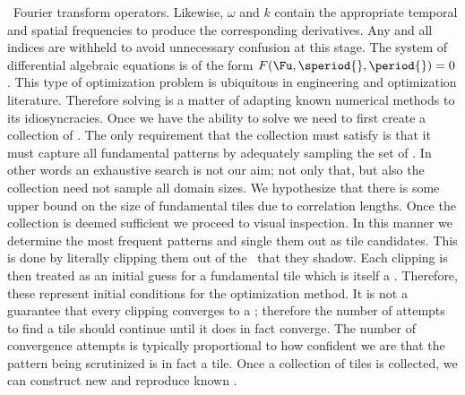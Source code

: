 \spt\ Fourier transform operators. Likewise, $\omega$ and $k$ contain the appropriate temporal and spatial frequencies to produce the corresponding derivatives. Any and all indices are withheld
to avoid unnecessary confusion at this stage.
The {\spt} system of differential algebraic equations 
is of the form $F(\Fu, \speriod{}, \period{})=0$. This type of optimization problem is ubiquitous in
engineering and optimization literature. Therefore solving  is a matter of
adapting known numerical methods to its idiosyncracies.
Once we have the ability to solve  we need to first create a collection
of \twots. The only requirement that the collection must satisfy is that it must capture
all fundamental patterns by adequately sampling the set of \twots. In other words an exhaustive
search is not our aim; not only that, but also the collection need not sample all {\spt} domain sizes.
We hypothesize that there is some upper bound on the {\spt} size of fundamental tiles due to {\spt}
correlation lengths.
Once the collection is deemed sufficient we proceed to visual inspection. In this manner
we determine the most frequent patterns and single them out as tile candidates. This is
done by literally clipping them out of the \twots\ that they shadow. Each clipping is
then treated as an initial guess for a fundamental tile which is itself a \twot. Therefore,
these represent initial conditions for the optimization method. It is not a guarantee
that every clipping converges to a \twot; therefore the number of attempts to find a tile
should continue until it does in fact converge. The number of convergence attempts is typically
proportional to how confident we are that the pattern being scrutinized is in fact a tile.
Once a collection of tiles is collected, we can construct new and reproduce known \twots.

